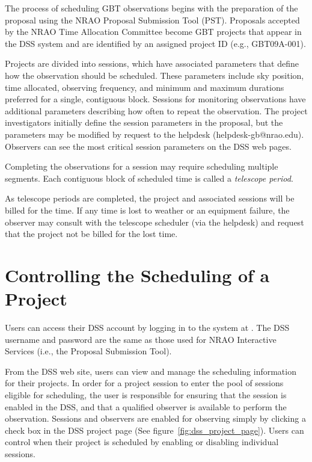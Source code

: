 The process of scheduling \gls{GBT} observations begins with the preparation of
the proposal using the \gls{NRAO} Proposal Submission Tool (PST). Proposals accepted
by the \gls{NRAO} Time Allocation Committee become \gls{GBT} projects that appear
in the \gls{DSS} system and are identified by an assigned project ID
(e.g., GBT09A-001).

Projects are divided into sessions, which have associated parameters that define how 
the observation should be scheduled. These parameters include sky position, time
allocated, observing frequency, and minimum and maximum durations preferred for a
single, contiguous block. Sessions for monitoring observations have additional
parameters describing how often to repeat the observation. The project investigators
initially define the session parameters in the proposal, but the parameters may be
modified by request to the helpdesk (helpdesk-gb@nrao.edu). Observers can see the
most critical session parameters on the \gls{DSS} web pages.

Completing the observations for a session may require scheduling multiple segments.
Each contiguous block of scheduled time is called a {\it telescope period}.

As telescope periods are completed, the project and associated sessions will be
billed for the time. If any time is lost to weather or an equipment failure, the
observer may consult with the telescope scheduler (via the helpdesk) and request
that the project not be billed for the lost time.

\section{Controlling the Scheduling of a Project}

Users can access their \gls{DSS} account by logging in to the system at 
.
The \gls{DSS} username and password are the same as those used for \gls{NRAO}
Interactive Services (i.e., the Proposal Submission Tool).

From the \gls{DSS} web site, users can view and manage the scheduling information
for their projects.  In order for a project session to enter the pool of sessions
eligible for scheduling, the user is responsible for ensuring that the session is
enabled in the \gls{DSS}, and that a qualified observer is available to perform the
observation. Sessions and observers are enabled for observing simply by clicking a
check box in the \gls{DSS} project page (See figure~\ref{fig:dss_project_page}).
Users can control when their project is scheduled by enabling or disabling
individual sessions.

